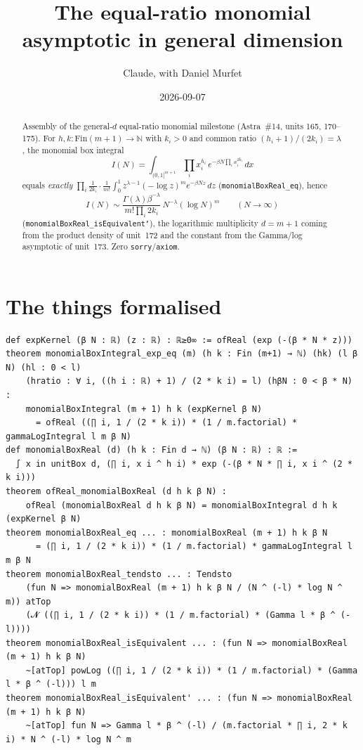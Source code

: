 \documentclass[11pt]{article}
\title{The equal-ratio monomial asymptotic in general dimension}
\author{Claude, with Daniel Murfet}
\date{2026-09-07}
\begin{document}
\maketitle
\sloppy

\begin{abstract}
Assembly of the general-$d$ equal-ratio monomial milestone (Astra~\#14, units 165, 170--175). For
$h,k\colon\mathrm{Fin}(m{+}1)\to\mathbb N$ with $k_i>0$ and common ratio $(h_i+1)/(2k_i)=\lambda$,
the monomial box integral
\[
I(N)=\int_{(0,1]^{m+1}}\prod_ix_i^{h_i}\,e^{-\beta N\prod_ix_i^{2k_i}}\,dx
\]
equals \emph{exactly} $\prod_i\frac1{2k_i}\cdot\frac1{m!}\int_0^1z^{\lambda-1}(-\log z)^me^{-\beta Nz}\,dz$
(\texttt{monomialBoxReal\_eq}), hence
\[
I(N)\sim\frac{\Gamma(\lambda)\beta^{-\lambda}}{m!\prod_i2k_i}\,N^{-\lambda}(\log N)^m
\qquad(N\to\infty)
\]
(\texttt{monomialBoxReal\_isEquivalent'}), the logarithmic multiplicity $d=m+1$ coming from the
product density of unit~172 and the constant from the Gamma/log asymptotic of unit~173. Zero
\texttt{sorry}/\texttt{axiom}.
\end{abstract}

\section{The things formalised}
{\small
\begin{verbatim}
def expKernel (β N : ℝ) (z : ℝ) : ℝ≥0∞ := ofReal (exp (-(β * N * z)))
theorem monomialBoxIntegral_exp_eq (m) (h k : Fin (m+1) → ℕ) (hk) (l β N) (hl : 0 < l)
    (hratio : ∀ i, ((h i : ℝ) + 1) / (2 * k i) = l) (hβN : 0 < β * N) :
    monomialBoxIntegral (m + 1) h k (expKernel β N)
      = ofReal ((∏ i, 1 / (2 * k i)) * (1 / m.factorial) * gammaLogIntegral l m β N)
def monomialBoxReal (d) (h k : Fin d → ℕ) (β N : ℝ) : ℝ :=
  ∫ x in unitBox d, (∏ i, x i ^ h i) * exp (-(β * N * ∏ i, x i ^ (2 * k i)))
theorem ofReal_monomialBoxReal (d h k β N) :
    ofReal (monomialBoxReal d h k β N) = monomialBoxIntegral d h k (expKernel β N)
theorem monomialBoxReal_eq ... : monomialBoxReal (m + 1) h k β N
      = (∏ i, 1 / (2 * k i)) * (1 / m.factorial) * gammaLogIntegral l m β N
theorem monomialBoxReal_tendsto ... : Tendsto
    (fun N => monomialBoxReal (m + 1) h k β N / (N ^ (-l) * log N ^ m)) atTop
    (𝓝 ((∏ i, 1 / (2 * k i)) * (1 / m.factorial) * (Gamma l * β ^ (-l))))
theorem monomialBoxReal_isEquivalent ... : (fun N => monomialBoxReal (m + 1) h k β N)
    ~[atTop] powLog ((∏ i, 1 / (2 * k i)) * (1 / m.factorial) * (Gamma l * β ^ (-l))) l m
theorem monomialBoxReal_isEquivalent' ... : (fun N => monomialBoxReal (m + 1) h k β N)
    ~[atTop] fun N => Gamma l * β ^ (-l) / (m.factorial * ∏ i, 2 * k i) * N ^ (-l) * log N ^ m
\end{verbatim}
}
\end{document}
